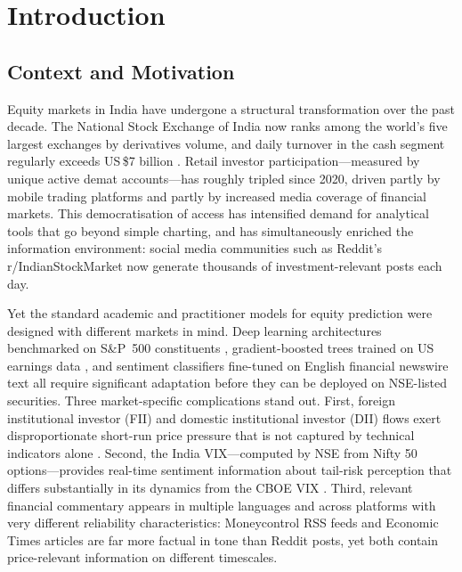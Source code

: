 \documentclass[ASNA,twocolumn]{USG}
\begin{document}
\maketitle

\section{Introduction}\label{sec:intro}

\subsection{Context and Motivation}

Equity markets in India have undergone a structural transformation over the
past decade. The National Stock Exchange of India now ranks among the world's
five largest exchanges by derivatives volume, and daily turnover in the cash
segment regularly exceeds US\,\$7 billion \citep{sebi2024}. Retail investor
participation---measured by unique active demat accounts---has roughly tripled
since 2020, driven partly by mobile trading platforms and partly by increased
media coverage of financial markets. This democratisation of access has
intensified demand for analytical tools that go beyond simple charting,
and has simultaneously enriched the information environment: social media
communities such as Reddit's r/IndianStockMarket now generate thousands of
investment-relevant posts each day.

Yet the standard academic and practitioner models for equity prediction were
designed with different markets in mind. Deep learning architectures benchmarked
on S\&P~500 constituents \citep{tsantekidis2017}, gradient-boosted trees
trained on US earnings data \citep{grinsztajn2022}, and sentiment classifiers
fine-tuned on English financial newswire text \citep{araci2019} all require
significant adaptation before they can be deployed on NSE-listed securities.
Three market-specific complications stand out. First, foreign institutional
investor (FII) and domestic institutional investor (DII) flows exert
disproportionate short-run price pressure that is not captured by technical
indicators alone \citep{bekaert2002}. Second, the India VIX---computed by NSE
from Nifty 50 options---provides real-time sentiment information about tail-risk
perception that differs substantially in its dynamics from the CBOE VIX
\citep{whaley2000}. Third, relevant financial commentary appears in multiple
languages and across platforms with very different reliability characteristics:
Moneycontrol RSS feeds and Economic Times articles are far more factual in tone
than Reddit posts, yet both contain price-relevant information on different
timescales.
\end{document}

